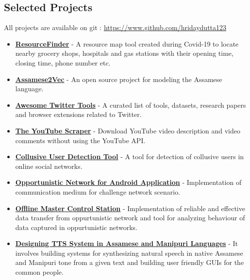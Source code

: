 \documentclass[margin, centered,lmodern]{res}
\begin{document}
\begin{resume}
\section{Selected Projects}
All projects are available on git : \url{https://www.github.com/hridaydutta123}
\begin{itemize}[leftmargin=*]
 \item \textbf{\href{https://resource-finder.github.io/}{ResourceFinder}} - A resource map tool created during Covid-19 to locate nearby grocery shops, hospitals and gas stations with their opening time, closing time, phone number etc.

 \item \textbf{\href{https://github.com/hridaydutta123/Assamese2Vec}{Assamese2Vec}} - An open source project for modeling the Assamese language.

 \item \textbf{\href{https://github.com/hridaydutta123/awesome-twitter-tools}{Awesome Twitter Tools}} - A curated list of tools, datasets, research papers and browser extensions related to Twitter. 
 
 \item \textbf{\href{https://github.com/hridaydutta123/the-youtube-scraper}{The YouTube Scraper}} - Download YouTube video description and video comments without using the YouTube API.

 \item \textbf{\href{https://github.com/hridaydutta123/collusive-user-detection-tool}{Collusive User Detection Tool}} - A tool for detection of collusive users in online social networks.

 \item \textbf{\href{https://github.com/ItsForkIT/pdm}{Opportunistic Network for Android Application}} - Implementation of communication medium for challenge network scenario. 
 \item \textbf{\href{http://www.github.com/hridaydutta123/offlinemcs}{Offline Master Control Station}} - Implementation of reliable and effective data transfer from oppurtunistic network and tool for analyzing behaviour of data captured in oppurtunistic networks.
 \item \textbf{\href{http://www.iitg.ernet.in/cseweb/tts/tts/Assamese/}{Designing TTS System in Assamese and Manipuri Languages}} - It involves building systems for synthesizing natural speech in native Assamese and Manipuri tone from a given text and building user friendly GUIs for the common people.


\end{itemize}
\end{resume}
\end{document}
